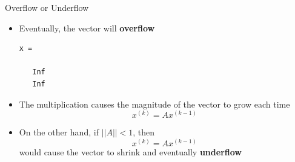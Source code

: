 \documentclass[10pt]{beamer}
\begin{document}

\begin{frame}[fragile]{Overflow or Underflow}
\begin{itemize}
    \item Eventually, the vector will \textbf{overflow}
\begin{lstlisting}[mathescape]
x =

   Inf
   Inf
\end{lstlisting}

    \item The multiplication causes the magnitude of the vector to grow each time
    $$
    x^{(k)}= A x^{(k-1)}
    $$

    \item On the other hand, if $||A||<1$, then 
    $$
    x^{(k)}= A x^{(k-1)}
    $$
    would cause the vector to shrink and eventually \textbf{underflow}
\end{itemize}
\end{frame}
\end{document}
